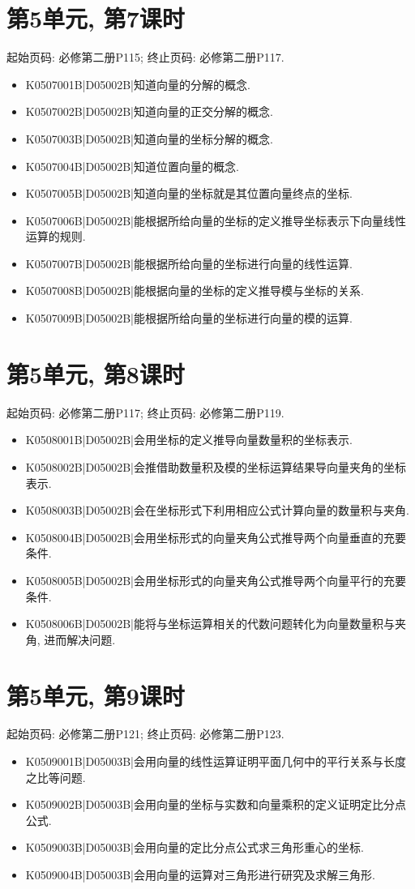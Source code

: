 \section*{第5单元, 第7课时}
起始页码: 必修第二册P115; 终止页码: 必修第二册P117.
\begin{itemize}
\item K0507001B|D05002B|知道向量的分解的概念.
\item K0507002B|D05002B|知道向量的正交分解的概念.
\item K0507003B|D05002B|知道向量的坐标分解的概念.
\item K0507004B|D05002B|知道位置向量的概念.
\item K0507005B|D05002B|知道向量的坐标就是其位置向量终点的坐标.
\item K0507006B|D05002B|能根据所给向量的坐标的定义推导坐标表示下向量线性运算的规则.
\item K0507007B|D05002B|能根据所给向量的坐标进行向量的线性运算.
\item K0507008B|D05002B|能根据向量的坐标的定义推导模与坐标的关系.
\item K0507009B|D05002B|能根据所给向量的坐标进行向量的模的运算.
\end{itemize}

\section*{第5单元, 第8课时}
起始页码: 必修第二册P117; 终止页码: 必修第二册P119.
\begin{itemize}
\item K0508001B|D05002B|会用坐标的定义推导向量数量积的坐标表示.
\item K0508002B|D05002B|会推借助数量积及模的坐标运算结果导向量夹角的坐标表示.
\item K0508003B|D05002B|会在坐标形式下利用相应公式计算向量的数量积与夹角.
\item K0508004B|D05002B|会用坐标形式的向量夹角公式推导两个向量垂直的充要条件.
\item K0508005B|D05002B|会用坐标形式的向量夹角公式推导两个向量平行的充要条件.
\item K0508006B|D05002B|能将与坐标运算相关的代数问题转化为向量数量积与夹角, 进而解决问题.
\end{itemize}

\section*{第5单元, 第9课时}
起始页码: 必修第二册P121; 终止页码: 必修第二册P123.
\begin{itemize}
\item K0509001B|D05003B|会用向量的线性运算证明平面几何中的平行关系与长度之比等问题.
\item K0509002B|D05003B|会用向量的坐标与实数和向量乘积的定义证明定比分点公式.
\item K0509003B|D05003B|会用向量的定比分点公式求三角形重心的坐标.
\item K0509004B|D05003B|会用向量的运算对三角形进行研究及求解三角形.
\end{itemize}

